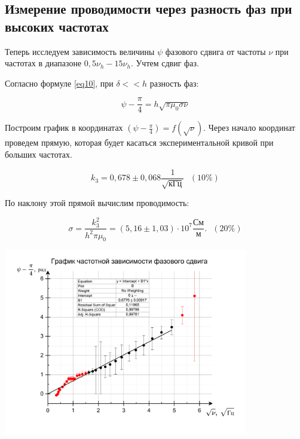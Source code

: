 \documentclass[a4paper,12pt]{article}
\theoremstyle{plain} %
\theoremstyle{definition} %
\theoremstyle{remark} %
\begin{document}
			\subsection{Измерение проводимости через разность фаз при высоких частотах}
			
				Теперь исследуем зависимость величины   $\psi$  фазового сдвига  от частоты  $\nu$  при частотах в диапазоне $0,5 \nu_h - 15 \nu_h$. Учтем сдвиг фаз. 
			
			Согласно формуле \eqref{eq10}, при $\delta << h $ разность фаз:
			
			\begin{equation*}
				\psi - \frac{\pi}{4} = h\sqrt{\pi \mu_0 \sigma \nu }
			\end{equation*}
		
		Построим график в координатах $(\psi - \frac{\pi}{4} ) = f(\sqrt{\nu})$. Через начало координат проведем прямую, которая будет касаться экспериментальной кривой при больших частотах.
		
		\begin{equation}
			k_3 = 0,678 \pm 0,068 \frac{1}{\sqrt{\text{кГц}}} \ \ \ (10\%)
		\end{equation}
		
		По наклону этой прямой вычислим проводимость:
		
		\begin{equation}
			\sigma = \frac{k_3^2}{h^2\pi \mu_0} = (5,16 \pm 1,03) \cdot 10^7 \frac{\text{См}}{\text{м}}. \ \ \  (20\%)
		\end{equation}
		
		
				\includegraphics[width = 0.8\textwidth]{pv}
				
\end{document}
